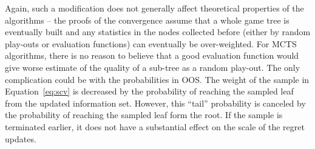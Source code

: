 Again, such a modification does not generally affect theoretical properties of the algorithms -- the proofs of the convergence assume that a whole game tree is eventually built and any statistics in the nodes collected before (either by random play-outs or evaluation functions) can eventually be over-weighted. For MCTS algorithms, there is no reason to believe that a good evaluation function would give worse estimate of the quality of a sub-tree as a random play-out. The only complication could be with the probabilities in OOS. The weight of the sample in Equation~\ref{eq:scv} is decreased by the probability of reaching the sampled leaf from the updated information set. However, this ``tail'' probability is canceled by the probability of reaching the sampled leaf form the root. 
If the sample is terminated earlier, it does not have a substantial effect on the scale of the regret updates.


